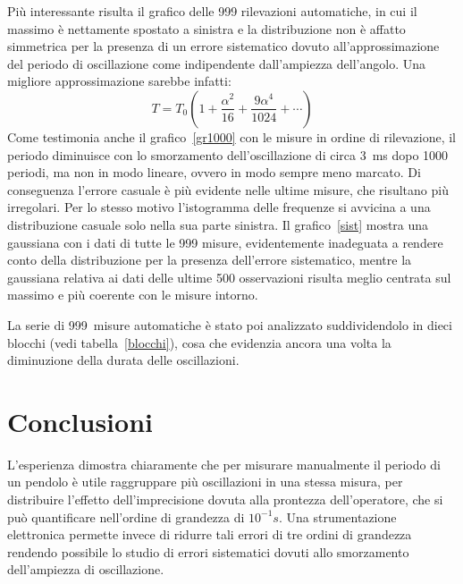 \documentclass[italian,a4paper,10pt]{article}
\theoremstyle{definition}
\begin{document}
Più interessante risulta il grafico delle 999 rilevazioni automatiche, in cui il massimo è nettamente spostato a sinistra e la distribuzione non è affatto simmetrica per la presenza di un errore sistematico dovuto all'approssimazione del periodo di oscillazione come indipendente dall'ampiezza dell'angolo. Una migliore approssimazione sarebbe infatti:
\begin{equation*}
 T = T_0\left(1+\dfrac{\alpha^2}{16}+\dfrac{9\alpha^4}{1024}+\cdots\right)
\end{equation*}
Come testimonia anche il grafico~\ref{gr1000} con le misure in ordine di rilevazione, il periodo diminuisce con lo smorzamento dell'oscillazione di circa 3~ms dopo 1000 periodi, ma non in modo lineare, ovvero in modo sempre meno marcato. Di conseguenza l'errore casuale è più evidente nelle ultime misure, che risultano più irregolari. Per lo stesso motivo l'istogramma delle frequenze si avvicina a una distribuzione casuale solo nella sua parte sinistra. Il grafico~\ref{sist} mostra una gaussiana con i dati di tutte le 999 misure, evidentemente inadeguata a rendere conto della distribuzione per la presenza dell'errore sistematico, mentre la gaussiana relativa ai dati delle ultime 500 osservazioni risulta meglio centrata sul massimo e più coerente con le misure intorno.

La serie di 999~misure automatiche è stato poi analizzato suddividendolo in dieci blocchi (vedi tabella~\ref{blocchi}), cosa che evidenzia ancora una volta la diminuzione della durata delle oscillazioni.

\section{Conclusioni}
L'esperienza dimostra chiaramente che per misurare manualmente il periodo di un pendolo è utile raggruppare più oscillazioni in una stessa misura, per distribuire l'effetto dell'imprecisione dovuta alla prontezza dell'operatore, che si può quantificare nell'ordine di grandezza di $10^{-1} s$. Una strumentazione elettronica permette invece di ridurre tali errori di tre ordini di grandezza rendendo possibile lo studio di errori sistematici dovuti allo smorzamento dell'ampiezza di oscillazione.
\newpage
\end{document}
